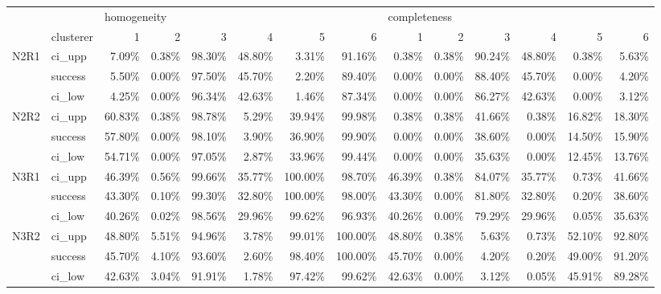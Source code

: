 \begin{tabular}{llrrrrrrrrrrrr}
\toprule
     & {} & \multicolumn{6}{l}{homogeneity} & \multicolumn{6}{l}{completeness} \\
     & clusterer &           1 &      2 &       3 &      4 &       5 &       6 &            1 &      2 &      3 &      4 &      5 &      6 \\
\midrule
N2R1 & ci\_upp &       7.09\% &  0.38\% &  98.30\% & 48.80\% &   3.31\% &  91.16\% &        0.38\% &  0.38\% & 90.24\% & 48.80\% &  0.38\% &  5.63\% \\
     & success &       5.50\% &  0.00\% &  97.50\% & 45.70\% &   2.20\% &  89.40\% &        0.00\% &  0.00\% & 88.40\% & 45.70\% &  0.00\% &  4.20\% \\
     & ci\_low &       4.25\% &  0.00\% &  96.34\% & 42.63\% &   1.46\% &  87.34\% &        0.00\% &  0.00\% & 86.27\% & 42.63\% &  0.00\% &  3.12\% \\
N2R2 & ci\_upp &      60.83\% &  0.38\% &  98.78\% &  5.29\% &  39.94\% &  99.98\% &        0.38\% &  0.38\% & 41.66\% &  0.38\% & 16.82\% & 18.30\% \\
     & success &      57.80\% &  0.00\% &  98.10\% &  3.90\% &  36.90\% &  99.90\% &        0.00\% &  0.00\% & 38.60\% &  0.00\% & 14.50\% & 15.90\% \\
     & ci\_low &      54.71\% &  0.00\% &  97.05\% &  2.87\% &  33.96\% &  99.44\% &        0.00\% &  0.00\% & 35.63\% &  0.00\% & 12.45\% & 13.76\% \\
N3R1 & ci\_upp &      46.39\% &  0.56\% &  99.66\% & 35.77\% & 100.00\% &  98.70\% &       46.39\% &  0.38\% & 84.07\% & 35.77\% &  0.73\% & 41.66\% \\
     & success &      43.30\% &  0.10\% &  99.30\% & 32.80\% & 100.00\% &  98.00\% &       43.30\% &  0.00\% & 81.80\% & 32.80\% &  0.20\% & 38.60\% \\
     & ci\_low &      40.26\% &  0.02\% &  98.56\% & 29.96\% &  99.62\% &  96.93\% &       40.26\% &  0.00\% & 79.29\% & 29.96\% &  0.05\% & 35.63\% \\
N3R2 & ci\_upp &      48.80\% &  5.51\% &  94.96\% &  3.78\% &  99.01\% & 100.00\% &       48.80\% &  0.38\% &  5.63\% &  0.73\% & 52.10\% & 92.80\% \\
     & success &      45.70\% &  4.10\% &  93.60\% &  2.60\% &  98.40\% & 100.00\% &       45.70\% &  0.00\% &  4.20\% &  0.20\% & 49.00\% & 91.20\% \\
     & ci\_low &      42.63\% &  3.04\% &  91.91\% &  1.78\% &  97.42\% &  99.62\% &       42.63\% &  0.00\% &  3.12\% &  0.05\% & 45.91\% & 89.28\% \\

\end{tabular}
